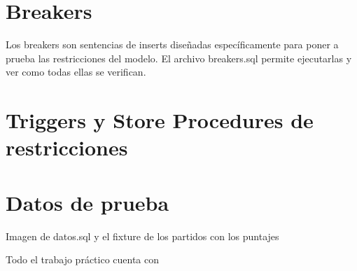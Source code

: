 \documentclass[11pt, a4paper, spanish]{article}
\begin{document}
\newpage 
\section{Breakers}

Los breakers son sentencias de inserts dise\~{n}adas espec\'ificamente para poner a prueba las restricciones del modelo.
El archivo breakers.sql permite ejecutarlas y ver como todas ellas se verifican.

\newpage 
\section{Triggers y Store Procedures de restricciones}


\newpage 
\section{Datos de prueba}
Imagen de datos.sql y el fixture de los partidos con los puntajes

Todo el trabajo pr\'actico cuenta con 
\end{document}
